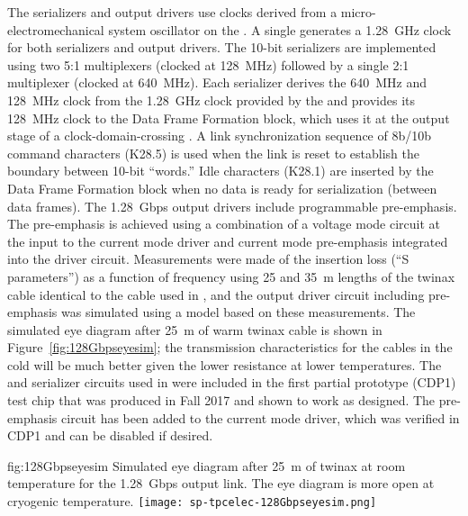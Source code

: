 The serializers and output drivers use clocks derived from a micro-electromechanical
system oscillator on the . A single  generates a 
\SI{1.28}{GHz} clock for both serializers and output drivers. The \num{10}-bit
serializers are implemented using two \num{5}:\num{1} multiplexers (clocked at \SI{128}{MHz}) 
followed by a single \num{2}:\num{1} multiplexer (clocked at \SI{640}{MHz}). Each serializer 
derives the \SI{640}{MHz} and \SI{128}{MHz} clock from the \SI{1.28}{GHz} 
clock provided by the  and provides its \SI{128}{MHz} clock to 
the Data Frame Formation block, which uses it at the output stage of a 
clock-domain-crossing . A link synchronization sequence of 8b/10b 
command characters (K28.5) is used when the link is reset to establish the 
boundary between \num{10}-bit ``words.'' Idle characters (K28.1) are inserted 
by the Data Frame Formation block when no data is ready for serialization 
(between data frames). The \SI{1.28}{Gbps} output drivers include programmable 
pre-emphasis. The pre-emphasis is achieved using a combination of a voltage 
mode circuit at the input to the current mode driver and current mode 
pre-emphasis integrated into the driver circuit. Measurements were made 
of the insertion loss (``S parameters'') as a function of frequency using
\num{25} and \SI{35}{m} lengths of the twinax cable identical to the 
cable used in , and the output driver circuit including 
pre-emphasis was simulated using a  model based on these 
measurements. The simulated eye diagram after \SI{25}{m} of warm twinax 
cable is shown in Figure~\ref{fig:128Gbpseyesim}; the transmission characteristics
for the cables in the cold will be much better given the lower resistance at lower
temperatures. The  and serializer circuits used in 
were included in the first partial prototype (CDP1) 
test chip that was produced in Fall 2017 and shown to work as designed.  
The pre-emphasis circuit has been added to the current mode driver, which 
was verified in CDP1 and can be disabled if desired. 

\begin{dunefigure}
{fig:128Gbpseyesim}
{Simulated eye diagram after \SI{25}{m} of  twinax at room 
temperature for the  \SI{1.28}{Gbps} output link.  
The eye diagram is more open at cryogenic temperature.}
\texttt{[image: sp-tpcelec-128Gbpseyesim.png]}
\end{dunefigure}


